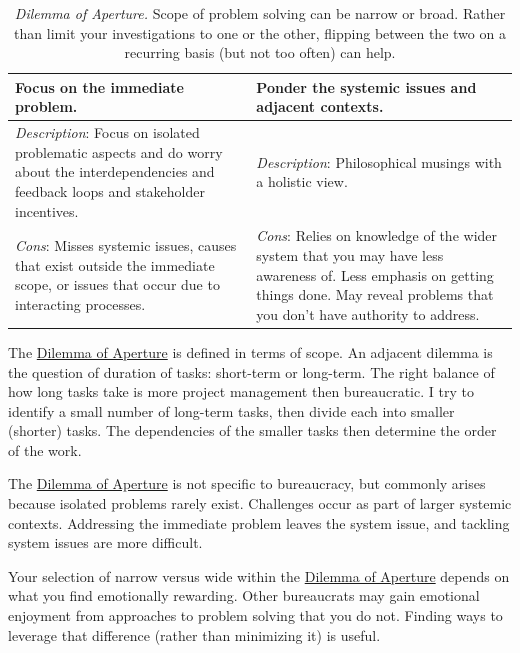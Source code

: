 \begin{center}
\begin{table}[H] %
\begin{tabular}{ | m{\dilemmatablewidth}| m{\dilemmatablewidth} | } 
  \hline
  \textbf{Focus on the immediate problem.} &
  \textbf{Ponder the systemic issues and adjacent contexts.} \\
  \hline
  \textit{Description}: Focus on isolated problematic aspects and do worry about the interdependencies and feedback loops and stakeholder incentives. &
  \textit{Description}: Philosophical musings with a holistic view. \\
  \hline
  \textit{Cons}: Misses systemic issues, causes that exist outside the immediate scope, or issues that occur due to interacting processes. & 
  \textit{Cons}: Relies on knowledge of the wider system that you may have less awareness of. Less emphasis on getting things done. May reveal problems that you don't have authority to address. \\
  \hline
\end{tabular}
\caption{
\textit{Dilemma of Aperture.}
Scope of problem solving can be narrow or broad. Rather than limit your investigations to one or the other, flipping between the two on a recurring basis (but not too often) can help.
}
\label{table:focus-vs-systemic}
\end{table}
\end{center}

The \href{table:focus-vs-systemic}{Dilemma of Aperture} is defined in terms of scope. An adjacent dilemma is the question of duration of tasks: short-term or long-term. The right balance of how long tasks take is more project management then bureaucratic. I try to identify a small number of long-term tasks, then divide each into smaller (shorter) tasks. The dependencies of the smaller tasks then determine the order of the work.

The \href{table:focus-vs-systemic}{Dilemma of Aperture} is not specific to bureaucracy, but commonly arises because isolated problems rarely exist. Challenges occur as part of larger systemic contexts. Addressing the immediate problem leaves the system issue, and tackling system issues are more difficult. 

Your selection of narrow versus wide within the \href{table:focus-vs-systemic}{Dilemma of Aperture} depends on what you find emotionally rewarding. Other bureaucrats may gain emotional enjoyment from approaches to problem solving that you do not. Finding ways to leverage that difference (rather than minimizing it) is useful. 

